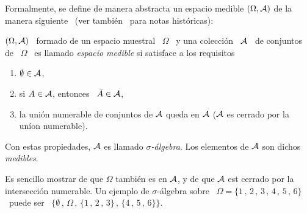 \begin{figure}[h!]
\begin{center}  \end{center}
%
\label{Fig:MP:Ensembles}
\end{figure}

Formalmente, se define  de manera abstracta un espacio  medible $(\Omega,\mathcal{A})$ de
la  manera  siguiente~\cite{Hal50,  Fel68,  Fel71,  Bre88,  IbaPar97,  AthLah06,
  Bog07:v1, Coh13} (ver  tambi\'en~\cite[\& Ref.]{BarNov78, Bor98, Sie18, Sie75,
  Sie76} para notas hist\'oricas):
%
\begin{definicion}
  $(\Omega, \mathcal{A})$ \ formado de un espacio muestral \ $\Omega$ \ y una colecci\'on
  \ $\mathcal{A}$  \ de conjuntos  de \  $\Omega$ \ es  llamado {\it espacio  medible} si
  satisface a los requisitos
  \begin{enumerate}%
  \item $\emptyset \in \mathcal{A}$,
  \item si $A \in \mathcal{A}$, entonces \ $\bar{A} \in \mathcal{A}$,
  \item la uni\'on numerable de conjuntos de $\mathcal{A}$ queda en $\mathcal{A}$ ($\mathcal{A}$ es cerrado
    por la un\'ion numerable).
  \end{enumerate}
  Con estas propiedades, $\mathcal{A}$ es llamado {\it $\sigma$-\'algebra}. Los elementos
  de $\mathcal{A}$ son dichos {\it medibles}.
\end{definicion}
%
\noindent Es  sencillo mostrar de  que $\Omega$ tambi\'en  es en $\mathcal{A}$, y  de que
$\mathcal{A}$   est   cerrado  por   la   intersecci\'on   numerable.    Un  ejemplo   de
$\sigma$-\'algebra sobre \ $\Omega = \{ 1 \, , \,  2 \, , \, 3 \, , \, 4 \, , \,
5 \, , \, 6 \}$ \ puede ser \ $\big\{ \emptyset \, , \, \Omega \, , \, \{ 1 \, ,
\, 2 \, , \, 3 \} \, , \, \{ 4 \, , \, 5 \, , \, 6 \} \big\}$.

